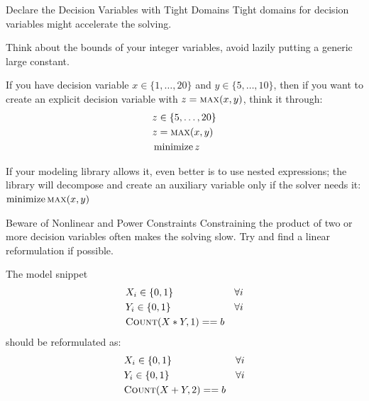 \documentclass{cons-beamer}
\begin{document}
\begin{frame}{Declare the Decision Variables with Tight Domains}\label{tight}
  \alert{Tight domains for decision variables might accelerate the solving.} \vfill
  \vspace{1em}

  Think about the bounds of your integer variables, avoid lazily putting a generic large constant.
  \begin{example}
    If you have decision variable $x \in \{1, \dots, 20\}$ and $y \in \{5, \dots, 10\}$, then if you want to create an explicit decision variable with $z = \textsc{max}(x,y)$, think it through: \\
    \vspace{-1.5em}
    \begin{align*}
      &z \in \{5, \dots, 20\} \\
      &z = \textsc{max}(x,y) \\
      &\operatorname*{minimize} z
    \end{align*}
    \vspace{-1.5em}

    If your modeling library allows it, even better is to use nested expressions; the library will decompose and create an auxiliary variable only if the solver needs it: \\
    \centering
    $\operatorname*{minimize} \textsc{max}(x,y)$
  \end{example}
\end{frame}

\begin{frame}{Beware of Nonlinear and Power Constraints}
  \alert{Constraining the product of two or more decision variables often makes
  the solving slow.}  Try and find a linear reformulation if possible.  \vfill
  
  \begin{example}
    The model snippet
    \begin{align*}
      &X_i \in \{0, 1\}  & \forall i\\
      &Y_i \in \{0, 1\}  & \forall i\\
      &\textsc{Count}(X*Y, 1) == b
    \end{align*}
    should be reformulated as: 
    \begin{align*}
      &X_i \in \{0, 1\}  & \forall i\\
      &Y_i \in \{0, 1\}  & \forall i\\
      &\textsc{Count}(X+Y, 2) == b
    \end{align*}
  \end{example}
\end{frame}
\end{document}
